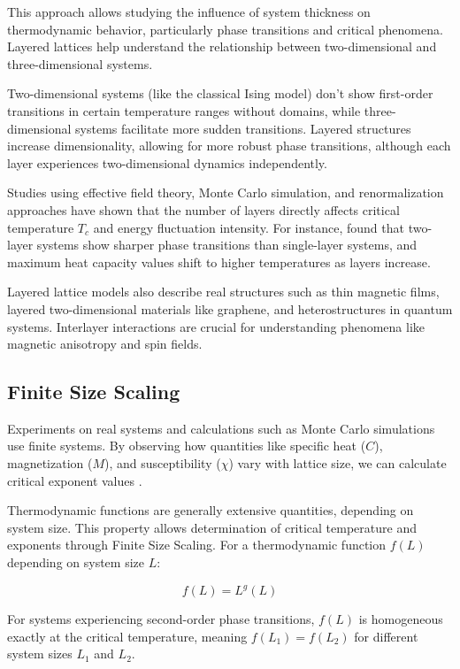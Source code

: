 \documentclass[conference, compsoc, twoside]{IEEEtran}
\begin{document}
This approach allows studying the influence of system thickness on thermodynamic behavior, particularly phase transitions and critical phenomena. Layered lattices help understand the relationship between two-dimensional and three-dimensional systems.

Two-dimensional systems (like the classical Ising model) don't show first-order transitions in certain temperature ranges without domains, while three-dimensional systems facilitate more sudden transitions. Layered structures increase dimensionality, allowing for more robust phase transitions, although each layer experiences two-dimensional dynamics independently.

Studies using effective field theory, Monte Carlo simulation, and renormalization approaches have shown that the number of layers directly affects critical temperature $T_c$ and energy fluctuation intensity. For instance, \cite{Ertaş2014} found that two-layer systems show sharper phase transitions than single-layer systems, and maximum heat capacity values shift to higher temperatures as layers increase.

Layered lattice models also describe real structures such as thin magnetic films, layered two-dimensional materials like graphene, and heterostructures in quantum systems. Interlayer interactions are crucial for understanding phenomena like magnetic anisotropy and spin fields.

\subsection{Finite Size Scaling}

Experiments on real systems and calculations such as Monte Carlo simulations use finite systems. By observing how quantities like specific heat ($C$), magnetization ($M$), and susceptibility ($\chi$) vary with lattice size, we can calculate critical exponent values \cite{Cardy1996}.

Thermodynamic functions are generally extensive quantities, depending on system size. This property allows determination of critical temperature and exponents through Finite Size Scaling. For a thermodynamic function $f(L)$ depending on system size $L$:

\begin{equation}
f(L) = L^g(L)
\label{eq:scaling}
\end{equation}

For systems experiencing second-order phase transitions, $f(L)$ is homogeneous exactly at the critical temperature, meaning $f(L_1) = f(L_2)$ for different system sizes $L_1$ and $L_2$.
\end{document}
